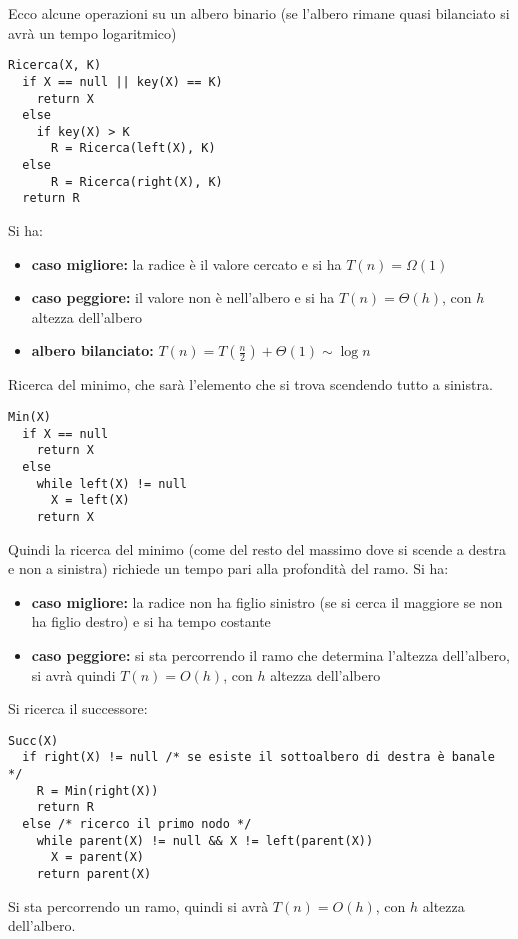 \documentclass[a4paper,12pt,oneside,tikz]{book}
\begin{document}
Ecco alcune operazioni su un albero binario (se l'albero rimane quasi bilanciato si avrà un tempo logaritmico)
\begin{esempio}
	\begin{verbatim}
Ricerca(X, K)
  if X == null || key(X) == K)
    return X
  else
    if key(X) > K
      R = Ricerca(left(X), K)
  else
      R = Ricerca(right(X), K)
  return R
\end{verbatim}
	Si ha:
	\begin{itemize}
		\item \textbf{caso migliore:} la radice è il valore cercato e si ha $T(n)=\Omega(1)$
		\item \textbf{caso peggiore:} il valore non è nell'albero e si ha $T(n)=\Theta(h)$, con $h$ altezza dell'albero
		\item \textbf{albero bilanciato:} $T(n)=T\left(\frac{n}{2}\right)+\Theta(1)\sim\log n$
	\end{itemize}
\end{esempio}
\begin{esempio}
	Ricerca del minimo, che sarà l'elemento che si trova scendendo tutto a sinistra.
	\begin{verbatim}
Min(X)
  if X == null
    return X
  else
    while left(X) != null
      X = left(X)
    return X
\end{verbatim}
	Quindi la ricerca del minimo (come del resto del massimo dove si scende a destra e non a sinistra) richiede un tempo pari alla profondità del ramo. Si ha:
	\begin{itemize}
		\item \textbf{caso migliore:} la radice non ha figlio sinistro (se si cerca il maggiore se non ha figlio destro) e si ha tempo costante
		\item \textbf{caso peggiore:} si sta percorrendo il ramo che determina l'altezza dell'albero, si avrà quindi $T(n)=O(h)$, con $h$ altezza dell'albero

	\end{itemize}
\end{esempio}
\begin{esempio}
	Si ricerca il successore:
	\begin{verbatim}
Succ(X)
  if right(X) != null /* se esiste il sottoalbero di destra è banale */
    R = Min(right(X))
    return R
  else /* ricerco il primo nodo */
    while parent(X) != null && X != left(parent(X))
      X = parent(X)
    return parent(X)
\end{verbatim}
	Si sta percorrendo un ramo, quindi si avrà $T(n)=O(h)$, con $h$ altezza dell'albero.
\end{esempio}
\end{document}
